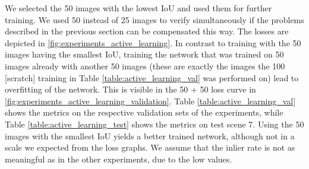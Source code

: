 We selected the 50 images with the lowest IoU and used them for further training. We used 50 instead of 25 images to verify simultaneously if the problems described in the previous section can be compensated this way. The losses are depicted in \fig \ref{fig:experiments_active_learning}. In contrast to training with the 50 images having the smallest IoU, training the network that was trained on 50 images already with another 50 images (these are exactly the images the 100 [scratch] training in Table \ref{table:active_learning_val} was performed on) lead to overfitting of the network. This is visible in the 50 + 50 loss curve in \fig \ref{fig:experiments_active_learning_validation}. Table \ref{table:active_learning_val} shows the metrics on the respective validation sets of the experiments, while Table \ref{table:active_learning_test} shows the metrics on test scene 7. Using the 50 images with the smallest IoU yields a better trained network, although not in a scale we expected from the loss graphs. We assume that the inlier rate is not as meaningful as in the other experiments, due to the low values.

